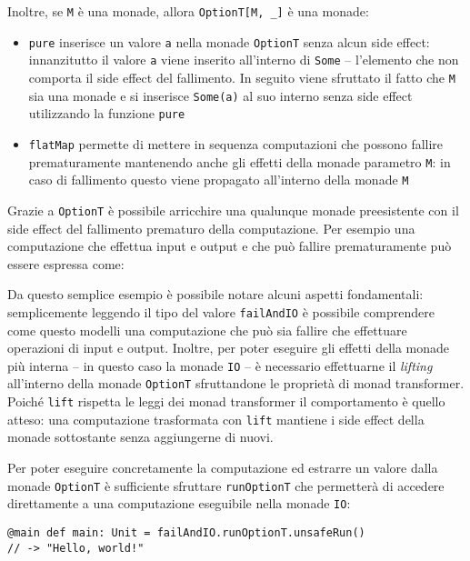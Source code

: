 Inoltre, se \lstinline{M} è una monade, allora \lstinline{OptionT[M, _]} è una monade:
\begin{itemize}
  \item \lstinline{pure} inserisce un valore \lstinline{a} nella monade \lstinline{OptionT} senza alcun side effect: innanzitutto il valore \lstinline{a} viene inserito all'interno di \lstinline{Some} -- l'elemento che non comporta il side effect del fallimento. In seguito viene sfruttato il fatto che \lstinline{M} sia una monade e si inserisce \lstinline{Some(a)} al suo interno senza side effect utilizzando la funzione \lstinline{pure}
  \item \lstinline{flatMap} permette di mettere in sequenza computazioni che possono fallire prematuramente mantenendo anche gli effetti della monade parametro \lstinline{M}: in caso di fallimento questo viene propagato all'interno della monade \lstinline{M}
\end{itemize}

Grazie a \lstinline{OptionT} è possibile arricchire una qualunque monade preesistente con il side effect del fallimento prematuro della computazione. Per esempio una computazione che effettua input e output e che può fallire prematuramente può essere espressa come:

Da questo semplice esempio è possibile notare alcuni aspetti fondamentali: semplicemente leggendo il tipo del valore \lstinline{failAndIO} è possibile comprendere come questo modelli una computazione che può sia fallire che effettuare operazioni di input e output. Inoltre, per poter eseguire gli effetti della monade più interna -- in questo caso la monade \lstinline{IO} -- è necessario effettuarne il \emph{lifting} all'interno della monade \lstinline{OptionT} sfruttandone le proprietà di monad transformer. Poiché \lstinline{lift} rispetta le leggi dei monad transformer il comportamento è quello atteso: una computazione trasformata con \lstinline{lift} mantiene i side effect della monade sottostante senza aggiungerne di nuovi.

Per poter eseguire concretamente la computazione ed estrarre un valore dalla monade \lstinline{OptionT} è sufficiente sfruttare \lstinline{runOptionT} che permetterà di accedere direttamente a una computazione eseguibile nella monade \lstinline{IO}:
\begin{lstlisting}[language=scala3]
@main def main: Unit = failAndIO.runOptionT.unsafeRun()
// -> "Hello, world!"
\end{lstlisting}

